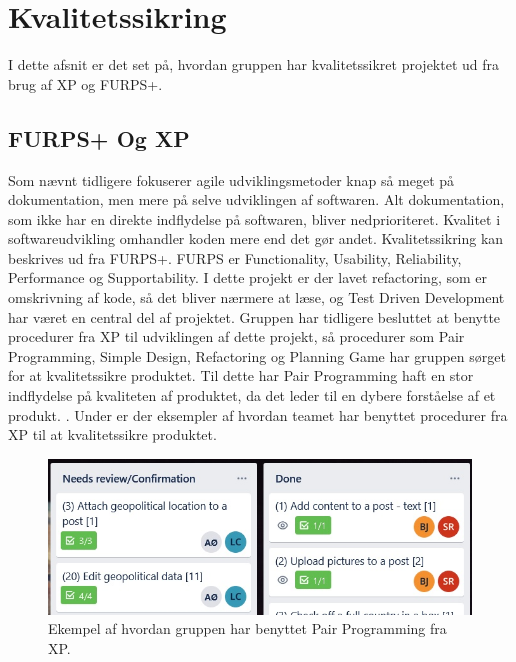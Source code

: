 \chapter{Kvalitetssikring}\label{ch:Kvalitetssikring}

I dette afsnit er det set på, hvordan gruppen har kvalitetssikret projektet ud fra brug af XP og FURPS+. 




\section{FURPS+ Og XP}


Som nævnt tidligere fokuserer agile udviklingsmetoder knap så meget på dokumentation, men mere på selve udviklingen af softwaren. Alt dokumentation, som ikke har en direkte indflydelse på softwaren, bliver nedprioriteret. Kvalitet i softwareudvikling omhandler koden mere end det gør andet. Kvalitetssikring kan beskrives ud fra FURPS+\cite{furps}. FURPS er Functionality, Usability, Reliability, Performance og Supportability. I dette projekt er der lavet refactoring, som er omskrivning af kode, så det bliver nærmere at læse, og Test Driven Development har været en central del af projektet. Gruppen har tidligere besluttet at benytte procedurer fra XP til udviklingen af dette projekt, så procedurer som Pair Programming, Simple Design, Refactoring og Planning Game har gruppen sørget for at kvalitetssikre produktet. Til dette har Pair Programming haft en stor indflydelse på kvaliteten af produktet, da det leder til en dybere forståelse af et produkt. \cite{Sommerville}. 
Under er der eksempler af hvordan teamet har benyttet procedurer fra XP til at kvalitetssikre produktet. 



\begin{figure}
    \includegraphics[width=\linewidth]{figures/pairprogramming.jpg}
    \caption{Ekempel af hvordan gruppen har benyttet Pair Programming fra XP.}
    \label{fig:Pair}
\end{figure}



